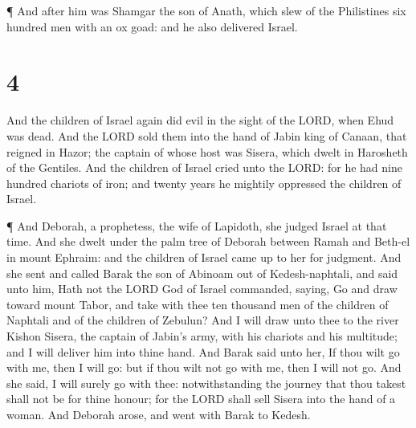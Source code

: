  ¶ And after him was Shamgar the son of Anath, which slew
of the Philistines six hundred men with an ox goad: and he also
delivered Israel.

\hypertarget{section-3}{%
\section{4}\label{section-3}}

 And the children of Israel again did evil in the sight of
the LORD, when Ehud was dead.  And the LORD sold them into
the hand of Jabin king of Canaan, that reigned in Hazor; the captain of
whose host was Sisera, which dwelt in Harosheth of the Gentiles.
 And the children of Israel cried unto the LORD: for he had
nine hundred chariots of iron; and twenty years he mightily oppressed
the children of Israel.

 ¶ And Deborah, a prophetess, the wife of Lapidoth, she
judged Israel at that time.  And she dwelt under the palm
tree of Deborah between Ramah and Beth-el in mount Ephraim: and the
children of Israel came up to her for judgment.  And she
sent and called Barak the son of Abinoam out of Kedesh-naphtali, and
said unto him, Hath not the LORD God of Israel commanded, saying, Go and
draw toward mount Tabor, and take with thee ten thousand men of the
children of Naphtali and of the children of Zebulun?  And I
will draw unto thee to the river Kishon Sisera, the captain of Jabin's
army, with his chariots and his multitude; and I will deliver him into
thine hand.  And Barak said unto her, If thou wilt go with
me, then I will go: but if thou wilt not go with me, then I will not go.
 And she said, I will surely go with thee: notwithstanding
the journey that thou takest shall not be for thine honour; for the LORD
shall sell Sisera into the hand of a woman. And Deborah arose, and went
with Barak to Kedesh.


